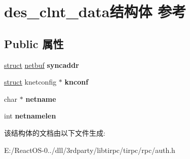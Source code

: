 \hypertarget{structdes__clnt__data}{}\section{des\+\_\+clnt\+\_\+data结构体 参考}
\label{structdes__clnt__data}
\subsection*{Public 属性}
\begin{DoxyCompactItemize}
\item 
\mbox{\label{structdes__clnt__data_aab7f137eb4236a0115f9085bbcfb8018}} 
\hyperlink{interfacestruct}{struct} \hyperlink{structnetbuf}{netbuf} {\bfseries syncaddr}
\item 
\mbox{\label{structdes__clnt__data_a7cf12eeb5bf60ac85e03c432daa05f68}} 
\hyperlink{interfacestruct}{struct} knetconfig $\ast$ {\bfseries knconf}
\item 
\mbox{\label{structdes__clnt__data_affd2c9d691b759892dfa607bcb3547bd}} 
char $\ast$ {\bfseries netname}
\item 
\mbox{\label{structdes__clnt__data_a465b3fa544459293665610c5a7fd16cf}} 
int {\bfseries netnamelen}
\end{DoxyCompactItemize}


该结构体的文档由以下文件生成\+:\begin{DoxyCompactItemize}
\item 
E\+:/\+React\+O\+S-\/0../dll/3rdparty/libtirpc/tirpc/rpc/auth.\+h\end{DoxyCompactItemize}
